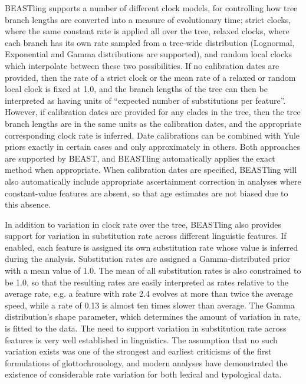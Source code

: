 \documentclass[10pt,a4paper]{article}
\begin{document}
BEASTling supports a number of different clock models, for controlling how tree branch lengths are converted into a measure of evolutionary time; strict clocks, where the same constant rate is applied all over the tree, relaxed clocks\cite{Drummond2006}, where each branch has its own rate sampled from a tree-wide distribution (Lognormal, Exponential and Gamma distributions are supported), and random local clocks\cite{Drummond2010} which interpolate between these two possibilities.  If no calibration dates are provided, then the rate of a strict clock or the mean rate of a relaxed or random local clock is fixed at 1.0, and the branch lengths of the tree can then be interpreted as having units of ``expected number of substitutions per feature''.  However, if calibration dates are provided for any clades in the tree, then the tree branch lengths are in the same units as the calibration dates, and the appropriate corresponding clock rate is inferred.  Date calibrations can be combined with Yule priors exactly in certain cases\cite{Heled2011} and only approximately in others.  Both approaches are supported by BEAST, and BEASTling automatically applies the exact method when appropriate.  When calibration dates are specified, BEASTling will also automatically include appropriate ascertainment correction in analyses where constant-value features are absent, so that age estimates are not biased due to this absence.

In addition to variation in clock rate over the tree, BEASTling also provides support for variation in substitution rate across different linguistic features.  If enabled, each feature is assigned its own substitution rate whose value is inferred during the analysis.  Substitution rates are assigned a Gamma-distributed prior with a mean value of 1.0.  The mean of all substitution rates is also constrained to be 1.0, so that the resulting rates are easily interpreted as rates relative to the average rate, e.g. a feature with rate 2.4 evolves at more than twice the average speed, while a rate of 0.13 is almost ten times slower than average.  The Gamma distribution's shape parameter, which determines the amount of variation in rate, is fitted to the data.  The need to support variation in substitution rate across features is very well established in linguistics.  The assumption that no such variation exists was one of the strongest and earliest criticisms of the first formulations of glottochronology, and modern analyses have demonstrated the existence of considerable rate variation for both lexical\cite{Pagel2007} and typological\cite{Greenhill2010,Dediu2011} data.
\end{document}
